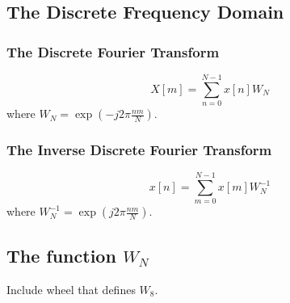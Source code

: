
\subsection*{The Discrete Frequency Domain}

\subsubsection*{The Discrete Fourier Transform}

$$
X[m] = \sum_{n=0}^{N-1} x[n] W_N
$$
where $W_N = \exp(-j2\pi\frac{nm}{N})$.

\subsubsection*{The Inverse Discrete Fourier Transform}

$$
x[n] = \sum_{m=0}^{N-1}  x[m]W_N^{-1}
$$
where $W_N^{-1}=\exp(j2\pi\frac{nm}{N})$.

\subsection*{The function $W_N$}

Include wheel that defines $W_8$.

\endinput

